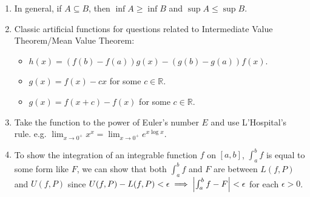 \documentclass[12pt, lettersize]{book}
\theoremstyle{plain}
\theoremstyle{definition}
\theoremstyle{remark}
\newcommand{\R}{\mathbb{R}}
\begin{document}
\begin{enumerate}
		\item In general, if $A\subseteq B$, then $\inf A\geq \inf B$ and $\sup A\leq \sup B$.
		\item Classic artificial functions for questions related to Intermediate Value Theorem/Mean Value Theorem:
		\begin{itemize}
			\item $h(x)=(f(b)-f(a))g(x)-(g(b)-g(a))f(x)$.
			\item $g(x)=f(x)-cx$ for some $c\in\R$.
			\item $g(x)=f(x+c)-f(x)$ for some $c\in\R$.
		\end{itemize}
		\item Take the function to the power of Euler's number $E$ and use L'Hospital's rule. e.g. $\lim_{x\rightarrow0^+}x^x=\lim_{x\rightarrow0^+}e^{x\log x}$.
		\item To show the integration of an integrable function $f$ on $[a,b]$, $\int_{a}^{b}f$ is equal to some form like $F$, we can show that both $\int_{a}^{b}f$ and $F$ are between $L(f,P)$ and $U(f,P)$ since $U(f,P)-L(f,P)<\epsilon\implies \abs{\int_{a}^{b}f-F}<\epsilon$ for each $\epsilon>0$.
  	\end{enumerate}
		
\end{document}
